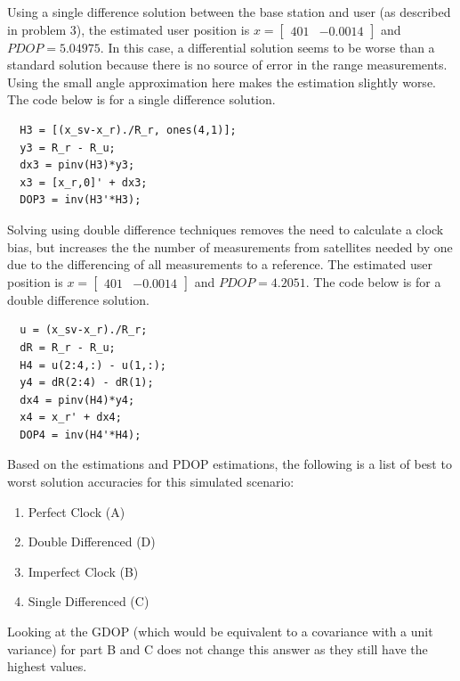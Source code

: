 \documentclass[11pt]{article}
\begin{document}
\begin{enumerate}[label=\textbf{\arabic*.}]
  Using a single difference solution between the base station and user (as 
  described in problem 3), the estimated user position is $x = \begin{bmatrix} 
  401 & -0.0014 \end{bmatrix}$ and $PDOP = 5.04975$. In this case, a differential solution 
  seems to be worse than a standard solution because there is no source of 
  error in the range measurements. Using the small angle approximation here 
  makes the estimation slightly worse. The code below is for a single difference 
  solution.
  \begin{lstlisting}
  H3 = [(x_sv-x_r)./R_r, ones(4,1)];
  y3 = R_r - R_u;
  dx3 = pinv(H3)*y3;
  x3 = [x_r,0]' + dx3;
  DOP3 = inv(H3'*H3);
  \end{lstlisting}
  Solving using double difference techniques removes the need to calculate a 
  clock bias, but increases the the number of measurements from satellites needed 
  by one due to the differencing of all measurements to a reference. The 
  estimated user position is $x = \begin{bmatrix} 401 & -0.0014 \end{bmatrix}$ 
  and $PDOP = 4.2051$. The code below is for a double difference solution.
  \begin{lstlisting}
  u = (x_sv-x_r)./R_r;
  dR = R_r - R_u;
  H4 = u(2:4,:) - u(1,:);
  y4 = dR(2:4) - dR(1);
  dx4 = pinv(H4)*y4;
  x4 = x_r' + dx4;
  DOP4 = inv(H4'*H4);
  \end{lstlisting}
  Based on the estimations and PDOP estimations, the following is a list of best 
  to worst solution accuracies for this simulated scenario:
  \begin{enumerate}[1.]
    \itemsep -2pt
    \item Perfect Clock (A)
    \item Double Differenced (D)
    \item Imperfect Clock (B)
    \item Single Differenced (C)
  \end{enumerate}
  Looking at the GDOP (which would be equivalent to a covariance with a unit 
  variance) for part B and C does not change this answer as they still have 
  the highest values.


\end{enumerate}
\end{document}
